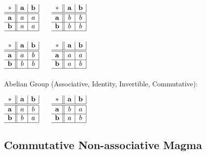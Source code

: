 $\begin{array}{c||c|c|}
  * & \mathbf{a} & \mathbf{b} \\ \hline \hline
  \mathbf{a} & a & a \\ \hline
  \mathbf{b} & a & a \\ \hline
\end{array}$ $\quad$ $\begin{array}{c||c|c|}
  * & \mathbf{a} & \mathbf{b} \\ \hline \hline
  \mathbf{a} & b & b \\ \hline
  \mathbf{b} & b & b \\ \hline
\end{array}$ \\ \hfill \\

$\begin{array}{c||c|c|}
  * & \mathbf{a} & \mathbf{b} \\ \hline \hline
  \mathbf{a} & a & b \\ \hline
  \mathbf{b} & b & b \\ \hline
\end{array}$ $\quad$ $\begin{array}{c||c|c|}
  * & \mathbf{a} & \mathbf{b} \\ \hline \hline
  \mathbf{a} & a & a \\ \hline
  \mathbf{b} & a & b \\ \hline
\end{array}$
\\ \\
Abelian Group (Associative, Identity, Invertible, Commutative):

$\begin{array}{c||c|c|}
  * & \mathbf{a} & \mathbf{b} \\ \hline \hline
  \mathbf{a} & a & b \\ \hline
  \mathbf{b} & b & a \\ \hline
\end{array}$ $\quad$ $\begin{array}{c||c|c|}
  * & \mathbf{a} & \mathbf{b} \\ \hline \hline
  \mathbf{a} & b & a \\ \hline
  \mathbf{b} & a & b \\ \hline
\end{array}$



\subsection{Commutative Non-associative Magma}\label{sec:commutative_magma}

